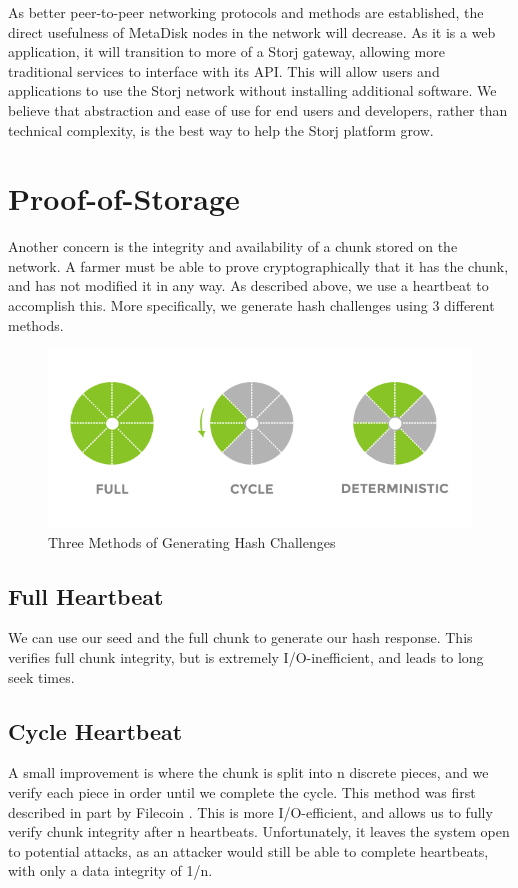 \documentclass[a4paper,10pt]{article}
\begin{document}
As better peer-to-peer networking protocols and methods are established, the direct usefulness of MetaDisk nodes in the network will decrease. As it is a web application, it will transition to more of a Storj gateway, allowing more traditional services to interface with its API. This will allow users and applications to use the Storj network without installing additional software. We believe that abstraction and ease of use for end users and developers, rather than technical complexity, is the best way to help the Storj platform grow. \\

\section{Proof-of-Storage}
Another concern is the integrity and availability of a chunk stored on the network. A farmer must be able to prove cryptographically that it has the chunk, and has not modified it in any way. As described above, we use a heartbeat to accomplish this. More specifically, we generate hash challenges using 3 different methods.  \\

\begin{figure}[h!]
\centering
\includegraphics[width=\linewidth]{8}
\caption{Three Methods of Generating Hash Challenges}
\end{figure}

\subsection{Full Heartbeat}
We can use our seed and the full chunk to generate our hash response. This verifies full chunk integrity, but is extremely I/O-inefficient, and leads to long seek times.
\subsection{Cycle Heartbeat}
A small improvement is where the chunk is split into n discrete pieces, and we verify each piece in order until we complete the cycle. This method was first described in part by Filecoin \cite{11}. This is more I/O-efficient, and allows us to fully verify chunk integrity after n heartbeats. Unfortunately, it leaves the system open to potential attacks, as an attacker would still be able to complete heartbeats, with only a data integrity of 1/n.
\end{document}
